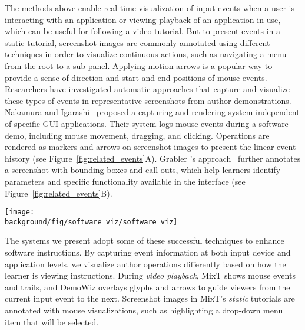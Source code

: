 The methods above enable real-time visualization of input events when a user is interacting with an application or viewing playback of an application in use, which can be useful for following a video tutorial.
%
But to present events in a static tutorial, screenshot images are commonly annotated using different techniques in order to visualize continuous actions, such as navigating a menu from the root to a sub-panel. Applying motion arrows is a popular way to provide a sense of direction and start and end positions of mouse events.
%
Researchers have investigated automatic approaches that capture and visualize these types of events in representative screenshots from author demonstrations. Nakamura and Igarashi~\cite{Nakamura:2008:ASV:1449715.1449721} proposed a capturing and rendering system independent of specific GUI applications. Their system logs mouse events during a software demo, including mouse movement, dragging, and clicking. Operations are rendered as markers and arrows on screenshot images to present the linear event history (see Figure~\ref{fig:related_events}A).
%
Grabler \ea{}'s approach~\cite{Grabler:2009jj} further annotates a screenshot with bounding boxes and call-outs, which help learners identify parameters and specific functionality available in the interface (see Figure~\ref{fig:related_events}B).

\begin{figure*}[t!]
  \centering
  \texttt{[image: \\background/fig/software\_viz/software\_viz]}
  \caption{Examples where software operations are automatically rendered on top of application screenshots, including (A) moving the mouse, dragging, clicking, and scrolling by Nakamura and Igarashi~\cite{Nakamura:2008:ASV:1449715.1449721} and (B) application-specific operations (a-b), parameter setting (c-f), and image manipulations (g-f) by Grabler \ea{}~\cite{Grabler:2009jj}.}
  \label{fig:related_events}
\end{figure*}

The systems we present adopt some of these successful techniques to enhance software instructions. By capturing event information at both input device and application levels, we visualize author operations differently based on how the learner is viewing instructions.
%
During \emph{video playback}, MixT shows mouse events and trails, and DemoWiz overlays glyphs and arrows to guide viewers from the current input event to the next.
%
Screenshot images in MixT's \emph{static} tutorials are annotated with mouse visualizations, such as highlighting a drop-down menu item that will be selected.

